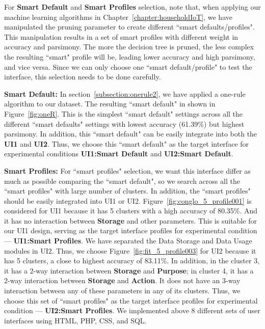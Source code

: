 For \textbf{Smart Default} and \textbf{Smart Profiles} selection, note that, when applying our machine learning algorithms in Chapter~\ref{chapter:householdIoT}, we have manipulated the pruning parameter to create different ``smart defaults/profiles". This manipulation results in a set of smart profiles with different weight in accuracy and parsimony. The more the decision tree is pruned, the less complex the resulting ``smart" profile will be, leading lower accuracy and high parsimony, and vice versa. Since we can only choose one ``smart default/profile" to test the interface, this selection needs to be done carefully.

\textbf{Smart Default:} In section~\ref{subsection:onerule2}, we have applied a one-rule algorithm to our dataset. The resulting ``smart default" in shown in Figure~\ref{fig:oneR}. This is the simplest ``smart default" settings across all the different ``smart defaults" settings with lowest accuracy (61.39\%) but highest parsimony. In addition, this ``smart default" can be easily integrate into both the \textbf{UI1} and \textbf{UI2}. Thus, we choose this ``smart default" as the target interface for experimental conditions \textbf{UI1:Smart Default} and \textbf{UI2:Smart Default}.

\textbf{Smart Profiles:} For ``smart profiles" selection, we want this interface differ as much as possible comparing the ``smart default", so we search across all the ``smart profiles" with large number of clusters. In addition, the ``smart profiles" should be easily integrated into UI1 or UI2. Figure~\ref{fig:conglo_5_profile001} is considered for UI1 because it has 5 clusters with a high accuracy of 80.35\%. And it has no interaction between \textbf{Storage} and other parameters. This is suitable for our UI1 design, serving as the target interface profiles for experimental condition --- \textbf{UI1:Smart Profiles}. We have separated the Data Storage and Data Usage modules in UI2. Thus, we choose Figure~\ref{fig:fit_5_profile003} for UI2 because it has 5 clusters, a close to highest accuracy of 83.11\%. In addition, in the cluster 3, it has a 2-way interaction between \textbf{Storage} and \textbf{Purpose}; in cluster 4, it has a 2-way interaction between \textbf{Storage} and \textbf{Action}. It does not have an 3-way interaction between any of these parameters in any of its clusters. Thus, we choose this set of ``smart profiles" as the target interface profiles for experimental condition --- \textbf{UI2:Smart Profiles}. We implemented above 8 different sets of user interfaces using HTML, PHP, CSS, and SQL.

